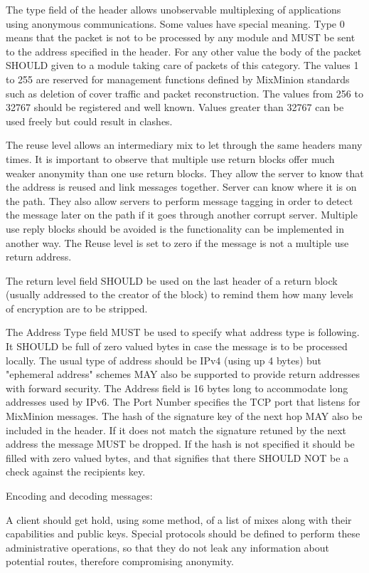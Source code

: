 The type field of the header allows unobservable multiplexing of applications 
using anonymous communications. Some values have special meaning. Type 0 means 
that the packet is not to be processed by any module and MUST be sent to the 
address specified in the header. For any other value the body of the packet SHOULD
given to a module taking care of packets of this category. The values
1 to 255 are reserved for management functions defined by MixMinion standards 
such as deletion of cover traffic and packet reconstruction. The values from 256 
to 32767 should be registered and well known. Values greater than 32767 can be 
used freely but could result in clashes.

The reuse level allows an intermediary mix to let through the same headers many
times. It is important to observe that multiple use return blocks offer much 
weaker anonymity than one use return blocks. They allow the server to know that
the address is reused and link messages together. Server can
know where it is on the path. They also allow servers to perform message tagging 
in order to detect the message later on the path if it goes through another
corrupt server. Multiple use reply blocks should be avoided is the
functionality can be implemented in another way. The Reuse level is
set to zero if the message is not a multiple use return address. 

The return level field SHOULD be used on the last header of a return block 
(usually addressed to the creator of the block) to remind them how many levels 
of encryption are to be stripped.

The Address Type field MUST be used to specify what address type is 
following. It SHOULD be full of zero valued bytes in case the message is to
be processed locally. The usual type of address should be IPv4 (using up 4 
bytes) but "ephemeral address" schemes MAY also be supported to provide return 
addresses with forward security. The Address field is 16 bytes long to 
accommodate long addresses used by IPv6. The Port Number specifies the TCP port 
that listens for MixMinion messages. The hash of the signature key of the next 
hop MAY also be included in the header. If it does not match the signature 
retuned by the next address the message MUST be dropped. If the hash is not 
specified it should be filled with zero valued bytes, and that signifies 
that there SHOULD NOT be a check against the recipients key.

Encoding and decoding messages:

A client should get hold, using some method, of a list of mixes along with 
their capabilities and public keys. Special protocols should be defined to 
perform these administrative operations, so that they do not leak any 
information about potential routes, therefore compromising anonymity.

